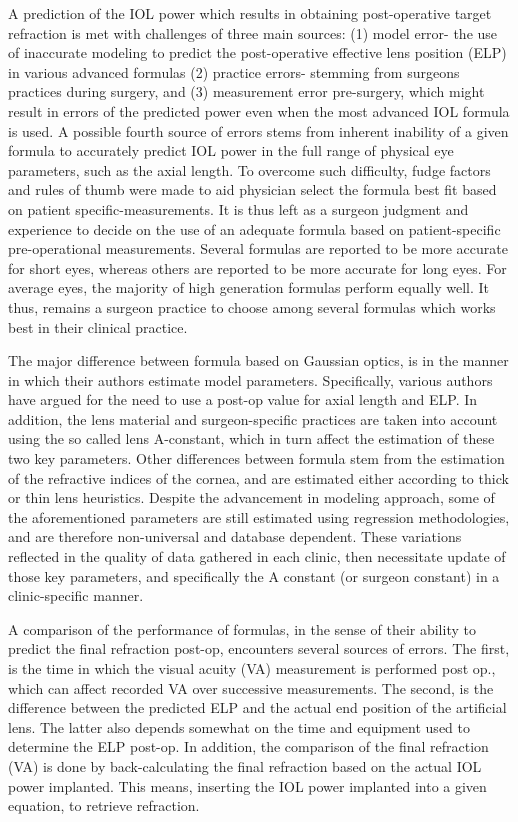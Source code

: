 \documentclass[article,twocolumn,preprint,10pt]{paper}%
\renewcommand{\(}{\left(}
\renewcommand{\)}{\right)}
\renewcommand{\[}{\left[}
\renewcommand{\]}{\right]}
\newcommand{\1}{\mbox{\boldmath$1$}}
\begin{document}
A prediction of the IOL power which results in obtaining post-operative target refraction is met with challenges of three main sources: (1) model error- the use of inaccurate modeling to predict the post-operative effective lens position (ELP) in various advanced formulas (2) practice errors- stemming from surgeons practices during surgery, and (3) measurement error pre-surgery, which might result in errors of the predicted power even when  the most advanced IOL formula is used. 
A possible fourth source of errors stems from inherent inability of a given formula to accurately predict IOL power in the full range of physical eye parameters, such as the axial length. To overcome such difficulty, fudge factors and rules of thumb were made to aid physician select the formula best fit based on patient specific-measurements. It is thus left as a surgeon judgment and experience to decide on the use of an adequate formula based on patient-specific pre-operational measurements. Several formulas are reported to be more accurate for short eyes, whereas others  are reported to be more accurate for long eyes. For average eyes, the majority of high generation formulas perform equally well. It thus, remains a surgeon practice to choose among several formulas which works best in their clinical practice. 

The major difference between formula based on Gaussian optics, is in the manner in which their authors estimate model parameters. Specifically, various authors have argued for the need to use a post-op value for axial length and ELP. In addition, the lens material and surgeon-specific  practices are taken into account using the so called lens A-constant, which in turn affect the estimation of these two key parameters. Other differences between formula stem from the estimation of the refractive indices of the cornea, and are estimated either according to thick or thin lens heuristics. Despite the advancement in modeling approach, some of the aforementioned parameters are still estimated using regression methodologies, and are therefore non-universal and database dependent. These variations reflected in the quality of data gathered in each clinic, then necessitate update of those key parameters, and specifically the A constant (or surgeon constant) in a clinic-specific manner. 

A comparison of the performance of formulas, in the sense of their ability to predict the final refraction post-op, encounters several sources of errors. The first, is the time in which the visual acuity (VA) measurement is performed post op., which can affect recorded VA over successive measurements. The second, is the difference between the predicted ELP and the actual end position of the artificial lens. The latter also depends somewhat on the time and equipment used to determine the ELP post-op. In addition, the comparison of the final refraction (VA) is done by back-calculating the final refraction based on the actual IOL power implanted. This means, inserting the IOL power implanted into a given equation, to retrieve refraction. 
\end{document}
